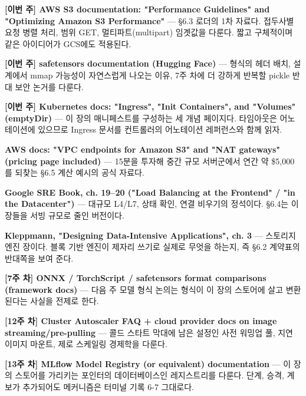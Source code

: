 \begin{tbbitemize}
  \item \textbf{[이번 주] AWS S3 documentation: "Performance Guidelines" and "Optimizing Amazon S3 Performance"} — §6.3 로더의 1차 자료다. 접두사별 요청 병렬 처리, 범위 GET, 멀티파트(multipart) 임곗값을 다룬다. 짧고 구체적이며 같은 아이디어가 GCS에도 적용된다.
  \item \textbf{[이번 주] safetensors documentation (Hugging Face)} — 형식의 헤더 배치, 설계에서 mmap 가능성이 자연스럽게 나오는 이유, 7주 차에 더 강하게 반복할 pickle 반대 보안 논거를 다룬다.
  \item \textbf{[이번 주] Kubernetes docs: "Ingress", "Init Containers", and "Volumes" (emptyDir)} — 이 장의 매니페스트를 구성하는 세 개념 페이지다. 타임아웃은 어노테이션에 있으므로 Ingress 문서를 컨트롤러의 어노테이션 레퍼런스와 함께 읽자.
  \item \textbf{AWS docs: "VPC endpoints for Amazon S3" and "NAT gateways" (pricing page included)} — 15분을 투자해 중간 규모 서버군에서 연간 약 \$5,000를 되찾는 §6.5 계산 예시의 공식 자료다.
  \item \textbf{Google SRE Book, ch. 19–20 ("Load Balancing at the Frontend" / "in the Datacenter")} — 대규모 L4/L7, 상태 확인, 연결 비우기의 정석이다. §6.4는 이 장들을 서빙 규모로 줄인 버전이다.
  \item \textbf{Kleppmann, "Designing Data-Intensive Applications", ch. 3} — 스토리지 엔진 장이다. 블록 기반 엔진이 제자리 쓰기로 실제로 무엇을 하는지, 즉 §6.2 계약표의 반대쪽을 보여 준다.
  \item \textbf{[7주 차] ONNX / TorchScript / safetensors format comparisons (framework docs)} — 다음 주 모델 형식 논의는 형식이 이 장의 스토어에 살고 변환된다는 사실을 전제로 한다.
  \item \textbf{[12주 차] Cluster Autoscaler FAQ + cloud provider docs on image streaming/pre-pulling} — 콜드 스타트 막대에 남은 설정인 사전 워밍업 풀, 지연 이미지 마운트, 제로 스케일링 경제학을 다룬다.
  \item \textbf{[13주 차] MLflow Model Registry (or equivalent) documentation} — 이 장의 스토어를 가리키는 포인터의 데이터베이스인 레지스트리를 다룬다. 단계, 승격, 계보가 추가되어도 메커니즘은 터미널 기록 6-7 그대로다.
\end{tbbitemize}

\vspace{5.0pt}

